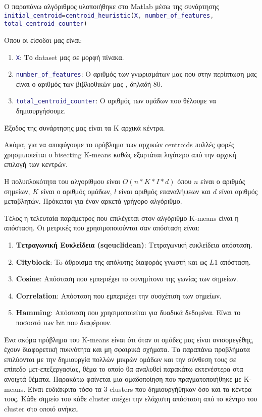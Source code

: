 Ο παραπάνω αλγόριθμος υλοποιήθηκε στο Matlab μέσω της συνάρτησης
\lstinline[language=MATLAB]!initial_centroid=centroid_heuristic(X, number_of_features, total_centroid_counter)!

Όπου οι είσοδοι μας είναι:
\begin{enumerate}
    \item \lstinline[language=MATLAB]!X!: Το dataset μας σε μορφή πίνακα.
    \item \lstinline[language=MATLAB]!number_of_features!: Ο αριθμός των γνωρισμάτων μας που στην περίπτωση μας είναι ο αριθμός των βιβλιοθικών μας , δηλαδή 80.
    \item \lstinline[language=MATLAB]!total_centroid_counter!: Ο αριθμός των ομάδων που θέλουμε να δημιουργήσουμε.
\end{enumerate}

Έξοδος της συνάρτησης μας είναι τα Κ αρχικά κέντρα.


Ακόμα, για να αποφύγουμε το πρόβλημα των αρχικών centroids πολλές φορές χρησμιποιείται ο bisecting K-means καθώς εξαρτάται λιγότερο από την αρχική επιλογή των κεντρών.

Η πολυπλοκότητα του αλγορίθμου είναι $ O(n*K*I*d)$ όπου $n$ είναι ο αριθμός σημείων, $Κ$ είναι ο αριθμός ομάδων, $l$ είναι αριθμός επαναλήψεων και $d$ είναι αριθμός μεταβλητών. Πρόκειται για έναν αρκετά γρήγορο αλγόριθμο.

Τέλος η τελευταία παράμετρος που επιλέγεται στον αλγόριθμο K-means είναι η απόσταση. Οι μετρικές που χρησιμοποιούνται σαν απόσταση είναι:
\begin{enumerate}
    \item \textbf{Τετραγωνική Ευκλείδεια (sqeuclidean)}: Τετραγωνική ευκλείδεια απόσταση.
    \item \textbf{Cityblock}: To άθροισμα της απόλυτης διαφοράς γνωστή και ως $L1$ απόσταση.
    \item \textbf{Cosine}: Απόσταση που εμπεριέχει το συνημίτονο της γωνίας των σημείων.
    \item \textbf{Correlation}: Απόσταση που εμπεριέχει την συσχέτιση των σημείων.
    \item \textbf{Hamming}: Απόσταση που χρησιμοποιείται για δυαδικά δεδομένα. Είναι το ποσοστό των bit που διαφέρουν.
\end{enumerate}

Ένα ακόμα πρόβλημα του K-means είναι ότι όταν οι ομάδες μας είναι ανισομεγέθης, έχουν διαφορετική πυκνότητα και μη σφαιρικά σχήματα. Τα παραπάνω προβλήματα επιλύονται με την δημιουργία πολλών μικρών ομάδων και την σύνθεση τους σε επίπεδο μετ-επεξεργασίας, θέμα το οποίο θα αναλυθεί παρακάτω εκτενέστερα στα ανοιχτά θέματα.
Παρακάτω φαίνεται μια ομαδοποίηση που πραγματοποιήθηκε με K-means. Είναι ευδιάκριτα τόσο τα 3 clusters που δημιουργήθηκαν όσο και τα κέντρα τους. Κάθε σημείο του κάθε cluster απέχει την ελάχιστη απόσταση από το κέντρο του cluster στο οποιό ανήκει.

